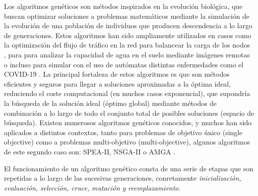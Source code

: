 \documentclass{uathesis-es}
\begin{document}
{	Los algoritmos genéticos son métodos inspirados en la evolución biológica, que buscan optimizar soluciones a problemas matemáticos mediante la simulación de la evolución de una población de individuos que producen descendencia a lo largo de generaciones. Estos algoritmos han sido ampliamente utilizados en casos como la optimización del flujo de tráfico en la red para balancear la carga de los nodos \cite{5483775}, para para analizar la capacidad de agua en el suelo mediante imágenes remotas \cite{PACHEPSKY1998213} o incluso para simular con el uso de autómatas distintas enfermedades como el COVID-19 \cite{GHOSH2020106692}. La principal fortaleza de estos algoritmos es que son métodos eficientes y seguros para llegar a soluciones aproximadas a la óptima ideal, reduciendo el coste computacional (en muchos casos exponencial), que supondría la búsqueda de la solución ideal (óptimo global) mediante métodos de combinación a lo largo de todo el conjunto total de posibles soluciones (espacio de búsqueda). Existen numerosos algoritmos genéticos conocidos, y muchos han sido aplicados a distintos contextos, tanto para problemas de objetivo único (single objective) como a problemas multi-objetivo (multi-objective), algunos algoritmos de este segundo caso son: SPEA-II, NSGA-II o AMGA \cite{wang2020comparative}.
	
	El funcionamiento de un algoritmo genético consta de una serie de etapas que son repetidas a lo largo de las sucesivas generaciones, conretamente \textit{inicialización, evaluación, selección, cruce, mutación y reemplazamiento}.
	
}
\end{document}
